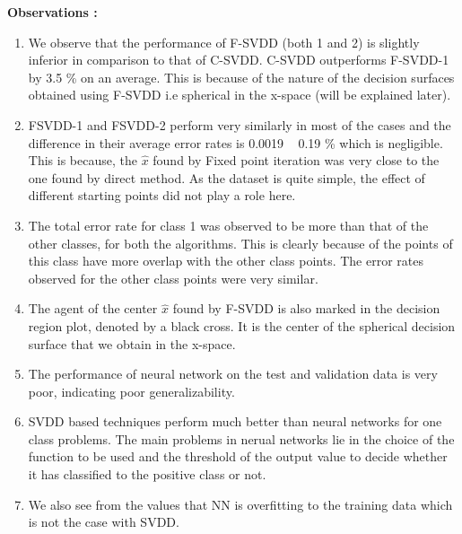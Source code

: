 \documentclass{article} %
\begin{document}
\textbf{Observations :}
\begin{enumerate}
\item We observe that the performance of F-SVDD  (both 1 and 2) is slightly inferior in comparison to that of C-SVDD. C-SVDD outperforms F-SVDD-1 by 3.5 \% on an average. This is because of the nature of the decision surfaces obtained using F-SVDD i.e  spherical in the x-space (will be explained later).

\item FSVDD-1 and FSVDD-2 perform very similarly in most of the cases and the difference in their average error rates is 0.0019 ~ 0.19 \% which is negligible. This is because, the $\hat{x}$ found by Fixed point iteration was very close to the one found by direct method. As the dataset is quite simple, the effect of different starting points did not play a role here.

\item The total error rate for class 1 was observed to be more than that of the other classes, for both the algorithms. This is clearly because of the points of this class have more overlap with the other class points. The error rates observed for the other class points were very similar.

\item The agent of the center $\hat{x}$ found by F-SVDD is also marked in the decision region plot, denoted by a black cross. It is the center of the spherical decision surface that we obtain in the x-space.
\newpage
\item The performance of neural network on the test and validation data is very poor, indicating poor generalizability.
\item SVDD based techniques perform much better than neural networks for one class problems. The main problems in nerual networks lie in the choice of the function to be used and the threshold of the output value to decide whether it has classified to the positive class or not.
\item We also see from the values that NN is overfitting to the training data which is not the case with SVDD.
\\[10pt]
\end{enumerate}
\end{document}
